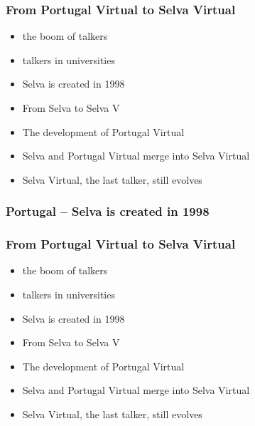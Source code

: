 \documentclass[aspectratio=169]{beamer}
\begin{document}
\begin{frame}
\frametitle{From Portugal Virtual to Selva Virtual}
  \begin{itemize}
    \item{} the boom of talkers
    \item{} talkers in universities
    \item{} Selva is created in 1998
    \item{} From Selva to Selva V
    \item{} The development of Portugal Virtual
    \item{} Selva and Portugal Virtual merge into Selva Virtual
    \item{} Selva Virtual, the last talker, still evolves
  \end{itemize}
\end{frame}

\begin{frame}
\frametitle{Portugal -- Selva is created in 1998}
\end{frame}

\begin{frame}
\frametitle{From Portugal Virtual to Selva Virtual}
  \begin{itemize}
    \item{} the boom of talkers
    \item{} talkers in universities
    \item{} Selva is created in 1998
    \item{} From Selva to Selva V
    \item{} The development of Portugal Virtual
    \item{} Selva and Portugal Virtual merge into Selva Virtual
    \item{} Selva Virtual, the last talker, still evolves
  \end{itemize}
\end{frame}
\end{document}

